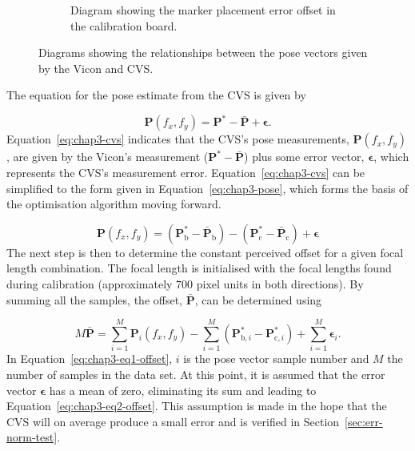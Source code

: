 \begin{figure}
\begin{subfigure}[t]{0.48\textwidth}
    \caption{Diagram showing the marker placement error offset in the calibration board. }
    \label{fig:chap3-p-bar}
  \end{subfigure}
\caption{Diagrams showing the relationships between the pose vectors given by the Vicon and CVS.}
\end{figure}

The equation for the pose estimate from the CVS is given by

\begin{equation}
  \label{eq:chap3-cvs}
  \bm{P}(f_x, f_y) = \bm{P}^* - \bar{\bm{P}} + \bm{\epsilon}.
\end{equation}
Equation~\ref{eq:chap3-cvs} indicates that the CVS's pose measurements, $\bm{P}(f_x, f_y)$, are given by the Vicon's measurement ($\bm{P}^* - \bar{\bm{P}}$) plus some error vector, $\bm{\epsilon}$, which represents the CVS's measurement error. Equation~\ref{eq:chap3-cvs} can be simplified to the form given in Equation~\ref{eq:chap3-pose}, which forms the basis of the optimisation algorithm moving forward.  

\begin{equation}
  \label{eq:chap3-pose}
  \bm{P}(f_x, f_y) = (\bm{P}^*_\mathrm{b} - \bar{\bm{P}}_\mathrm{b}) - (\bm{P}^*_\mathrm{c} - \bar{\bm{P}}_\mathrm{c}) + \bm{\epsilon}
\end{equation}
The next step is then to determine the constant perceived offset for a given focal length combination. The focal length is initialised with the focal lengths found during calibration (approximately 700 pixel units in both directions). By summing all the samples, the offset, $\bm{\bar{P}}$, can be determined using 

\begin{equation}
  \label{eq:chap3-eq1-offset}
  M\bar{\bm{P}} = \sum\limits_{i=1}^M \bm{P}_i(f_x, f_y) - \sum\limits_{i=1}^M(\bm{P}^*_{\mathrm{b},i} - \bm{P}^*_{\mathrm{c}, i}) + \sum\limits_{i=1}^M\bm{\epsilon}_i.
\end{equation}
In Equation~\ref{eq:chap3-eq1-offset}, $i$ is the pose vector sample number and $M$ the number of samples in the data set. At this point, it is assumed that the error vector $\bm{\epsilon}$ has a mean of zero, eliminating its sum and leading to Equation~\ref{eq:chap3-eq2-offset}. This assumption is made in the hope that the CVS will on average produce a small error and is verified in Section~\ref{sec:err-norm-test}. 


